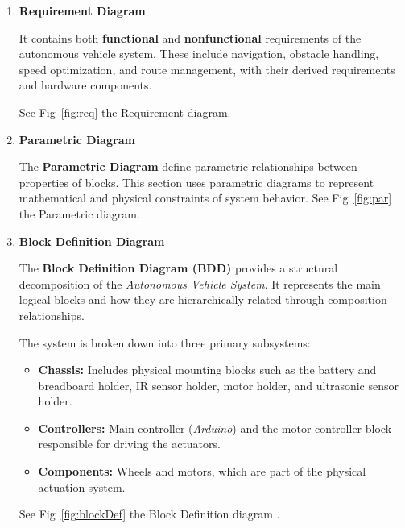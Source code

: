 \documentclass[conference]{IEEEtran}
\begin{document}
\begin{enumerate}

\item \textbf{Requirement Diagram}

 \hspace*{1em}It contains both \textbf{functional} and \textbf{nonfunctional} requirements of the autonomous vehicle system. These include navigation, obstacle handling, speed optimization, and route management,  with their derived requirements and hardware components.
 
 \hspace*{1em}See Fig~\ref{fig:req} the Requirement diagram.
 \vspace{1em}
\item \textbf{Parametric Diagram}

 \hspace*{1em}The \textbf{ Parametric Diagram} define parametric relationships between properties of blocks. This section uses parametric diagrams to represent mathematical and physical constraints of system behavior. See  Fig~\ref{fig:par} the Parametric diagram.
\vspace{1em}
\item \textbf{Block Definition Diagram}

\hspace*{1em}The \textbf{Block Definition Diagram (BDD)} provides a  structural decomposition of the \textit{Autonomous Vehicle System}. It represents the main logical blocks and how they are hierarchically related through composition relationships.

\vspace{1em}The  system is broken down into three primary subsystems:
\begin{itemize}
    \item \textbf{Chassis:} Includes physical mounting blocks such as the battery and breadboard holder, IR sensor holder, motor holder, and ultrasonic sensor holder.
    
    \item \textbf{Controllers:} Main controller (\textit{Arduino}) and the motor controller block responsible for driving the actuators.
    
    \item \textbf{Components:} Wheels and motors, which are part of the physical actuation system.
\end{itemize}
\hspace*{1em}See  Fig~\ref{fig:blockDef} the Block Definition diagram .


\end{enumerate}
\end{document}
